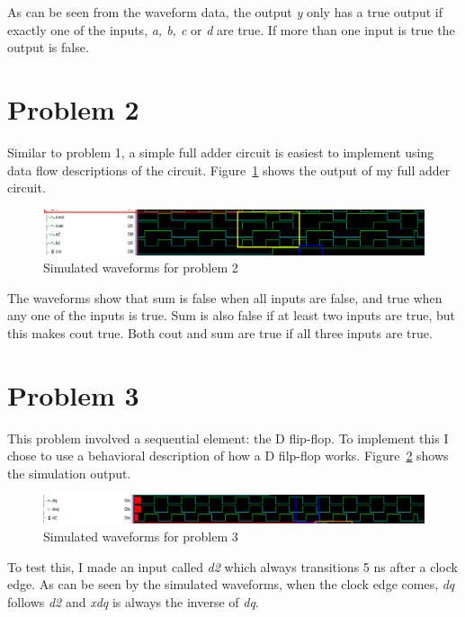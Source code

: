\documentclass[fullpage]{article}
\begin{document}
As can be seen from the waveform data, the output \emph{y} only has a true output if exactly one of the inputs, \emph{a, b, c} or \emph{d} are true. If more than one input is true the output is false.

\section*{Problem 2}

Similar to problem 1, a simple full adder circuit is easiest to implement using data flow descriptions of the circuit. Figure~\ref{fig:p2} shows the output of my full adder circuit.

\begin{figure}[ht!]
 	\includegraphics[scale=0.5,keepaspectratio=true]{../images/prob2.png}
 	\caption{Simulated waveforms for problem 2}
 	\label{fig:p2}
\end{figure}

The waveforms show that sum is false when all inputs are false, and true when any one of the inputs is true. Sum is also false if at least two inputs are true, but this makes cout true. Both cout and sum are true if all three inputs are true.

\section*{Problem 3}

This problem involved a sequential element: the D flip-flop. To implement this I chose to use a behavioral description of how a D filp-flop works. Figure~\ref{fig:p3} shows the simulation output.

\begin{figure}[ht!]
 	\includegraphics[scale=0.5,keepaspectratio=true]{../images/prob3.png}
 	\caption{Simulated waveforms for problem 3}
 	\label{fig:p3}
\end{figure}

To test this, I made an input called \emph{d2} which always transitions 5 ns after a clock edge. As can be seen by the simulated waveforms, when the clock edge comes, \emph{dq} follows \emph{d2} and \emph{xdq} is always the inverse of \emph{dq}.
\end{document}
